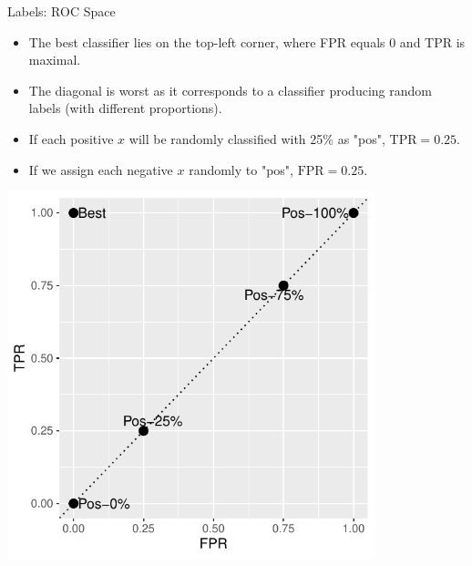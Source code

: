 \documentclass[11pt,compress,t,notes=noshow, xcolor=table]{beamer}
\begin{document}

\begin{vbframe}{Labels: ROC Space}

\begin{itemize}
  \item The best classifier lies on the top-left corner, where FPR equals 0 and 
  TPR is maximal.
  \item The diagonal is worst as it corresponds to a classifier producing random 
  labels (with different proportions). 
\end{itemize}

\lz

\begin{minipage}[c]{0.5\textwidth}
  \begin{itemize}
    \item If each positive $x$ will be randomly classified 
    with 25\% as "pos", $\text{TPR} = 0.25$.
    \item If we assign each negative $x$ randomly to "pos", $\text{FPR} = 0.25$.
  \end{itemize}
\end{minipage}%
\begin{minipage}[c]{0.5\textwidth}
  \centering \includegraphics[width=0.8\textwidth]{figure/eval_mclass_roc_sp_2}
\end{minipage}

\end{vbframe}

\end{document}
